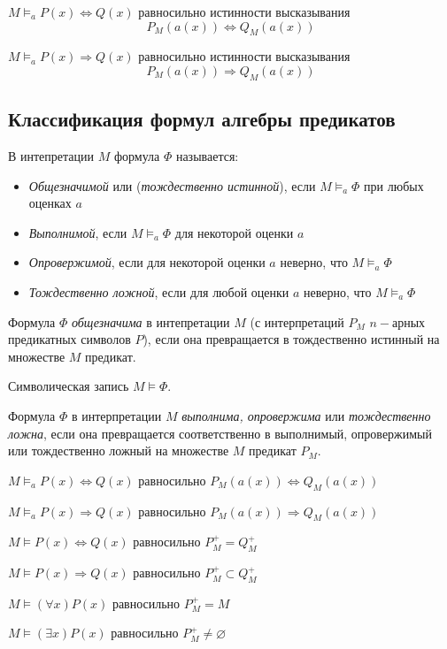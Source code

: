 \begin{example}
    $M\models_a P(x)\Leftrightarrow Q(x)$ равносильно истинности высказывания $$P_M(a(x))\Leftrightarrow Q_M(a(x))$$
\end{example}

\begin{example}
    $M\models_a P(x)\Rightarrow Q(x)$ равносильно истинности высказывания $$P_M(a(x))\Rightarrow Q_M(a(x))$$
\end{example}

\subsection*{Классификация формул алгебры предикатов}
\begin{definition}
    В интепретации $M$ формула $\Phi$ называется:
    \begin{itemize}
        \item \textit{Общезначимой} или (\textit{тождественно истинной}), если $M\models_a\Phi$ при любых оценках $a$

        \item \textit{Выполнимой}, если $M\models_a\Phi$ для некоторой оценки $a$

        \item \textit{Опровержимой}, если для некоторой оценки $a$ неверно, что $M\models_a\Phi$

        \item \textit{Тождественно ложной}, если для любой оценки $a$ неверно, что $M\models_a\Phi$
    \end{itemize}
\end{definition}

Формула $\Phi$ \textit{общезначима} в интепретации $M$ (с интерпретаций $P_M$ $n-$арных предикатных символов $P$), если она превращается в тождественно истинный на множестве $M$ предикат.

Символическая запись $M\models \Phi$.

Формула $\Phi$ в интерпретации $M$ \textit{выполнима, опровержима} или \textit{тождественно ложна}, если она превращается соответственно в выполнимый, опровержимый или тождественно ложный на множестве $M$ предикат $P_M$.

\begin{example}
    $M\models_a P(x)\Leftrightarrow Q(x)$ равносильно $P_M(a(x))\Leftrightarrow Q_M(a(x))$

    $M\models_a P(x)\Rightarrow Q(x)$ равносильно $P_M(a(x))\Rightarrow Q_M(a(x))$

    $M\models P(x)\Leftrightarrow Q(x)$ равносильно $P_M^+ = Q_M^+$

    $M\models P(x)\Rightarrow Q(x)$ равносильно $P_M^+ \subset  Q_M^+$

    $M\models(\forall x)P(x)$ равносильно $P_M^+ = M$

    $M\models (\exists x)P(x)$ равносильно $P_M^+ \neq \varnothing $
\end{example}

